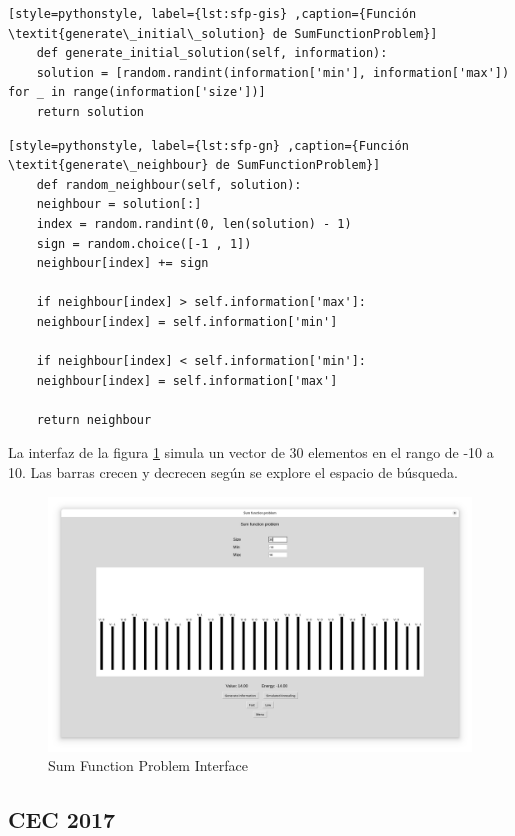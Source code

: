 \begin{lstlisting}[style=pythonstyle, label={lst:sfp-gis} ,caption={Función \textit{generate\_initial\_solution} de SumFunctionProblem}]
	def generate_initial_solution(self, information):
	solution = [random.randint(information['min'], information['max']) for _ in range(information['size'])]
	return solution
\end{lstlisting}

\begin{lstlisting}[style=pythonstyle, label={lst:sfp-gn} ,caption={Función \textit{generate\_neighbour} de SumFunctionProblem}]
	def random_neighbour(self, solution):
	neighbour = solution[:]
	index = random.randint(0, len(solution) - 1)
	sign = random.choice([-1 , 1])
	neighbour[index] += sign
	
	if neighbour[index] > self.information['max']:
	neighbour[index] = self.information['min']
	
	if neighbour[index] < self.information['min']:
	neighbour[index] = self.information['max']
	
	return neighbour
\end{lstlisting}

La interfaz de la figura \ref{fig:sfp} simula un vector de 30 elementos en el rango de -10 a 10. Las barras crecen y decrecen según se explore el espacio de búsqueda. 

\begin{figure}[h!]
	\centering
	\includegraphics[width=\linewidth]{img/sfp}
	\caption{Sum Function Problem Interface}
	\label{fig:sfp}
\end{figure}

\subsection{CEC 2017}

